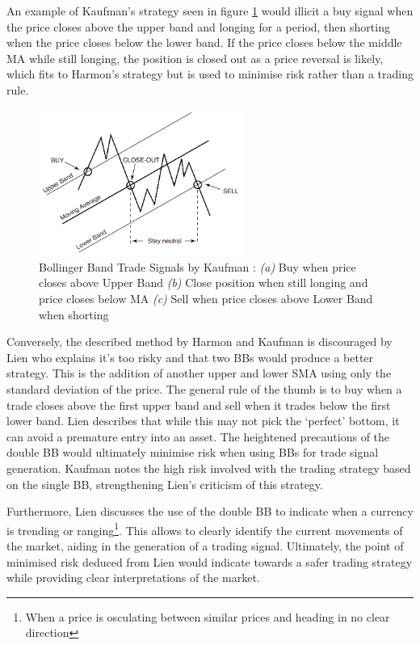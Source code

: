 An example of Kaufman's strategy seen in figure \ref{fig:related:BB_trade_strat} would illicit a buy signal when the price closes above the upper band and longing for a period, then shorting when the price closes below the lower band. If the price closes below the middle MA while still longing, the position is closed out as a price reversal is likely, which fits to Harmon's \cite{BOOK:Harmon:2014} strategy but is used to minimise risk rather than a trading rule.

\begin{figure}[htb]
    \centering
	\includegraphics[width=0.6\textwidth]{content/graphics/BB_Trade_Strat}
	\caption{Bollinger Band Trade Signals by Kaufman \cite{BOOK:Kaufman:2013}: 
	\textit{(a)} Buy when price closes above Upper Band
	\textit{(b)} Close position when still longing and price closes below MA
    \textit{(c)} Sell when price closes above Lower Band when shorting}
	\label{fig:related:BB_trade_strat}
\end{figure}

Conversely, the described method by Harmon \cite{BOOK:Harmon:2014} and Kaufman \cite{BOOK:Kaufman:2013} is discouraged by Lien \cite{BOOK:Lien:2016} who explains it's too risky and that two BBs would produce a better strategy. This is the addition of another upper and lower SMA using only the standard deviation of the price. The general rule of the thumb is to buy when a trade closes above the first upper band and sell when it trades below the first lower band. Lien describes that while this may not pick the `perfect' bottom, it can avoid a premature entry into an asset. The heightened precautions of the double BB would ultimately minimise risk when using BBs for trade signal generation. Kaufman \cite{BOOK:Kaufman:2013} notes the high risk involved with the trading strategy based on the single BB, strengthening Lien's criticism of this strategy.

Furthermore, Lien \cite{BOOK:Lien:2016} discusses the use of the double BB to indicate when a currency is trending or ranging\footnote{When a price is osculating between similar prices and heading in no clear direction}. This allows to clearly identify the current movements of the market, aiding in the generation of a trading signal. Ultimately, the point of minimised risk deduced from Lien would indicate towards a safer trading strategy while providing clear interpretations of the market. 

